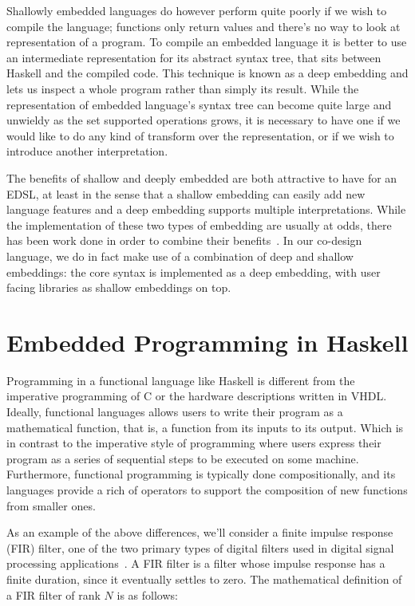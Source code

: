 \documentclass[../main.tex]{subfiles}
\begin{document}
Shallowly embedded languages do however perform quite poorly if we wish to compile the language; functions only return values and there's no way to look at representation of a program. To compile an embedded language it is better to use an intermediate representation for its abstract syntax tree, that sits between Haskell and the compiled code. This technique is known as a deep embedding and lets us inspect a whole program rather than simply its result. While the representation of embedded language's syntax tree can become quite large and unwieldy as the set supported operations grows, it is necessary to have one if we would like to do any kind of transform over the representation, or if we wish to introduce another interpretation.

The benefits of shallow and deeply embedded are both attractive to have for an EDSL, at least in the sense that a shallow embedding can easily add new language features and a deep embedding supports multiple interpretations. While the implementation of these two types of embedding are usually at odds, there has been work done in order to combine their benefits~\cite{svenningsson2012}. In our co-design language, we do in fact make use of a combination of deep and shallow embeddings: the core syntax is implemented as a deep embedding, with user facing libraries as shallow embeddings on top.

\section{Embedded Programming in Haskell}
\label{haskell}

Programming in a functional language like Haskell is different from the imperative programming of C or the hardware descriptions written in VHDL. Ideally, functional languages allows users to write their program as a mathematical function, that is, a function from its inputs to its output. Which is in contrast to the imperative style of programming where users express their program as a series of sequential steps to be executed on some machine. Furthermore, functional programming is typically done compositionally, and its languages provide a rich of operators to support the composition of new functions from smaller ones.

As an example of the above differences, we'll consider a finite impulse response (FIR) filter, one of the two primary types of digital filters used in digital signal processing applications~\cite{oppenheim1989}. A FIR filter is a filter whose impulse response has a finite duration, since it eventually settles to zero. The mathematical definition of a FIR filter of rank $N$ is as follows:
\end{document}
